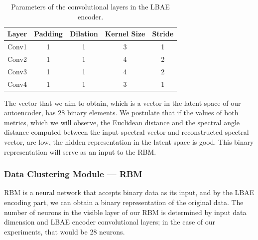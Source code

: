 \documentclass[a4paper,12pt]{article}
\begin{document}
\begin{table}[ht]
    \centering
    \caption{Parameters of the convolutional layers in the LBAE encoder.}
    \begin{tabular}{@{}lcccc@{}}
    \toprule
    Layer & Padding & Dilation & Kernel Size & Stride \\ \midrule
    Conv1 & 1       & 1        & 3           & 1      \\
    Conv2 & 1       & 1        & 4           & 2      \\
    Conv3 & 1       & 1        & 4           & 2      \\
    Conv4 & 1       & 1        & 3           & 1      \\ \bottomrule
    \end{tabular}
    \label{tab:conv_params}
\end{table}

The vector that we aim to obtain, which is a vector in the latent space of our autoencoder, has 28 binary elements. We postulate that if the values of both metrics, which we will observe, the Euclidean distance and the spectral angle distance computed between the input spectral vector and reconstructed spectral vector, are low, the hidden representation in the latent space is good. This binary representation will serve as an input to the RBM. 

\subsubsection{Data Clustering Module --- RBM}\label{rbm_implementation}
RBM is a neural network that accepts binary data as its input, and by the LBAE encoding part, we can obtain a binary representation of the original data. The number of neurons in the visible layer of our RBM is determined by input data dimension and LBAE encoder convolutional layers; in the case of our experiments, that would be 28 neurons. 
\end{document}
